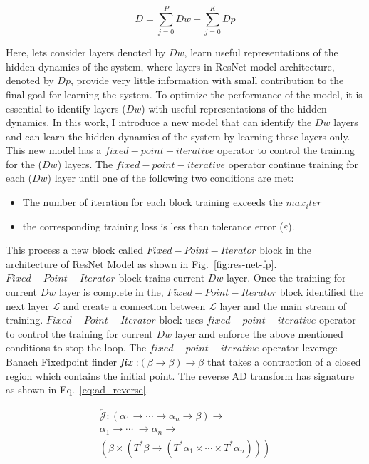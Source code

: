 \documentclass{article}
\begin{document}
\begin{equation}
   D = \sum_{j=0}^{P}Dw + \sum_{j=0}^{K}Dp  
   \label{eq:depth}
\end{equation}


Here, lets consider  layers denoted by $Dw$, learn useful representations of the hidden dynamics of the system, where layers in ResNet model architecture, denoted by $Dp$, provide very little information with small contribution to the final goal for learning the system. To optimize the performance of the model, it is essential to identify layers ($Dw$) with useful representations of the hidden dynamics. In this work, I introduce a new model that can identify the $Dw$ layers and can learn the hidden dynamics of the system by learning these layers only. This new model has a $fixed-point-iterative$ operator to control the training for the  ($Dw$) layers. The $fixed-point-iterative$ operator continue training for each  ($Dw$) layer until one of the following two conditions are met:


\begin{itemize}
    \item The number of iteration for each block training exceeds the $max_iter$
    \item the corresponding training loss is less than tolerance error ($\varepsilon$).
\end{itemize}

This process a new block called $Fixed-Point-Iterator$ block in the architecture of ResNet Model as shown in Fig.~\ref{fig:res-net-fp}. $Fixed-Point-Iterator$ block trains current $Dw$ layer.  Once the training for current $Dw$ layer is complete in the, $Fixed-Point-Iterator$ block identified the next layer $\mathcal{L}$ and create a connection between  $\mathcal{L}$ layer and the main stream of training. $Fixed-Point-Iterator$ block uses $fixed-point-iterative$ operator to control the training for current $Dw$ layer and enforce the above mentioned conditions to stop the loop. The $fixed-point-iterative$ operator leverage Banach Fixedpoint finder \textbf{\textit{fix}} :$(\beta \rightarrow \beta) \rightarrow \beta$ that takes a contraction of a closed region which contains the initial point. The reverse AD transform has signature as shown in  Eq.~\eqref{eq:ad_reverse}.

\begin{equation}\begin{array}{cc}
\overleftarrow{\mathcal{J}}:\left(\alpha_{1} \rightarrow \cdots \rightarrow \alpha_{n} \rightarrow \beta\right) \rightarrow\\
\alpha_{1} \rightarrow \cdots \; \rightarrow \alpha_{n} \rightarrow\\
\left(\beta \times\left(T^{*} \beta \rightarrow\left(T^{*} \alpha_{1} \times \cdots \times T^{*} \alpha_{n}\right)\right)\right)
\label{eq:ad_reverse}
\end{array}\end{equation}
\end{document}
